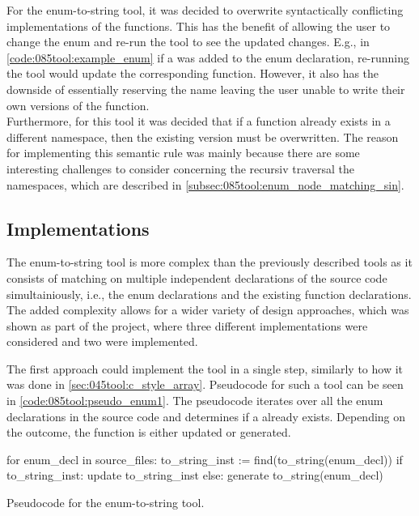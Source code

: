 For the enum-to-string tool, it was decided to overwrite syntactically conflicting implementations of the  functions.
This has the benefit of allowing the user to change the enum and re-run the tool to see the updated changes. E.g., in \cref{code:085tool:example_enum} if a  was added to the enum declaration, re-running the tool would update the corresponding  function.
However, it also has the downside of essentially reserving the  name leaving the user unable to write their own versions of the function.\\
Furthermore, for this tool it was decided that if a  function already exists in a different namespace, then the existing version must be overwritten. The reason for implementing this semantic rule was mainly because there are some interesting challenges to consider concerning the recursiv traversal the namespaces, which are described in \cref{subsec:085tool:enum_node_matching_sin}.
\pagebreak
\subsection{Implementations}
The enum-to-string tool is more complex than the previously described tools as it consists of matching on multiple independent declarations of the source code simultainiously, i.e., the enum declarations and the existing  function declarations. The added complexity allows for a wider variety of design approaches, which was shown as part of the project, where three different implementations were considered and two were implemented.

The first approach could implement the tool in a single step, similarly to how it was done in \cref{sec:045tool:c_style_array}. Pseudocode for such a tool can be seen in \cref{code:085tool:pseudo_enum1}. The pseudocode iterates over all the enum declarations in the source code and determines if a  already exists. Depending on the outcome, the function is either updated or generated.

\begin{listing}[H]
    \begin{pythoncode}
for enum_decl in source_files:
    to_string_inst := find(to_string(enum_decl))
    if to_string_inst:
        update to_string_inst
    else:
        generate to_string(enum_decl)
    \end{pythoncode}
    \caption{Pseudocode for the enum-to-string tool.}
    \label{code:085tool:pseudo_enum1}
\end{listing}

